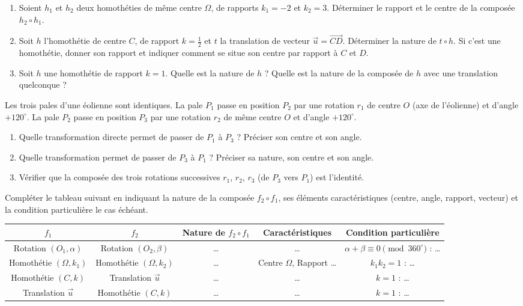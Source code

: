 \documentclass[11pt]{article}
\begin{document}
\begin{exercice}
\begin{enumerate}
    \item Soient $h_1$ et $h_2$ deux homothéties de même centre $\Omega$, de rapports $k_1 = -2$ et $k_2 = 3$. Déterminer le rapport et le centre de la composée $h_2 \circ h_1$.
    \item Soit $h$ l'homothétie de centre $C$, de rapport $k = \frac{1}{2}$ et $t$ la translation de vecteur $\vec{u} = \overrightarrow{CD}$. Déterminer la nature de $t \circ h$. Si c'est une homothétie, donner son rapport et indiquer comment se situe son centre par rapport à $C$ et $D$.
    \item Soit $h$ une homothétie de rapport $k=1$. Quelle est la nature de $h$ ? Quelle est la nature de la composée de $h$ avec une translation quelconque ?
\end{enumerate}
\end{exercice}

\begin{exercice}
Les trois pales d'une éolienne sont identiques. La pale $P_1$ passe en position $P_2$ par une rotation $r_1$ de centre $O$ (axe de l'éolienne) et d'angle $+120^\circ$. La pale $P_2$ passe en position $P_3$ par une rotation $r_2$ de même centre $O$ et d'angle $+120^\circ$.
\begin{enumerate}
    \item Quelle transformation directe permet de passer de $P_1$ à $P_3$ ? Préciser son centre et son angle.
    \item Quelle transformation permet de passer de $P_3$ à $P_1$ ? Préciser sa nature, son centre et son angle.
    \item Vérifier que la composée des trois rotations successives $r_1$, $r_2$, $r_3$ (de $P_3$ vers $P_1$) est l'identité.
\end{enumerate}
\end{exercice}

\begin{exercice}
Compléter le tableau suivant en indiquant la nature de la composée $f_2 \circ f_1$, ses éléments caractéristiques (centre, angle, rapport, vecteur) et la condition particulière le cas échéant.

\begin{tabular}{|c|c|c|c|c|}
\hline
$f_1$ & $f_2$ & Nature de $f_2 \circ f_1$ & Caractéristiques & Condition particulière \\
\hline
Rotation $(O_1, \alpha)$ & Rotation $(O_2, \beta)$ & \ldots & \ldots & $\alpha+\beta \equiv 0 \pmod{360^\circ}$ : \ldots \\
\hline
Homothétie $(\Omega, k_1)$ & Homothétie $(\Omega, k_2)$ & \ldots & Centre $\Omega$, Rapport \ldots & $k_1k_2 = 1$ : \ldots \\
\hline
Homothétie $(C, k)$ & Translation $\vec{u}$ & \ldots & \ldots & $k=1$ : \ldots \\
\hline
Translation $\vec{u}$ & Homothétie $(C, k)$ & \ldots & \ldots & $k=1$ : \ldots \\
\hline
\end{tabular}
\end{exercice}
\end{document}
